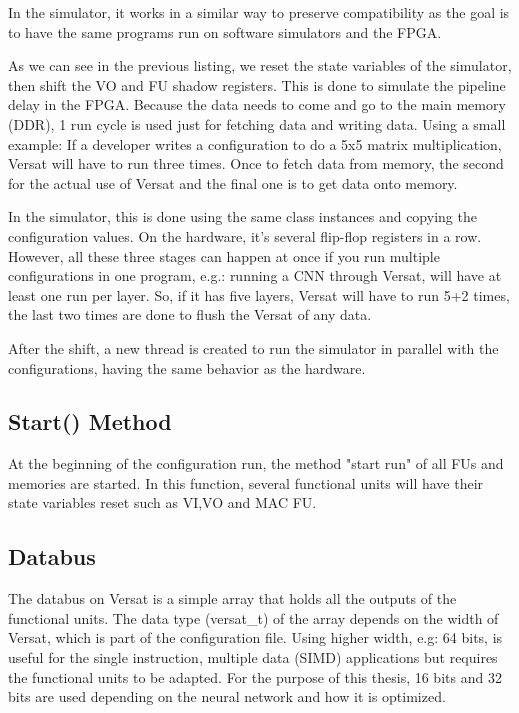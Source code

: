 In the simulator, it works in a similar way to preserve compatibility 
as the goal is to have the same
programs run on software simulators and the FPGA.



As we can see in the previous listing, we reset the state variables of the simulator, then shift the 
VO and FU shadow registers.
This is done to simulate the pipeline delay in the FPGA. 
Because the data needs to come and go to the main memory (DDR),
1 run cycle is used just for fetching data and writing data. 
Using a small example:
If a developer writes a configuration to do a 5x5 matrix multiplication, 
Versat will have to run three  times.
Once to fetch data from memory, the second for the actual use of Versat 
and the final one is to get data onto memory.

In the simulator, this is done using the same class instances and 
copying the configuration values. On the hardware, it's several flip-flop registers in a row.
However, all these three  stages can happen at once if you run multiple configurations in one program, 
e.g.: running a CNN
through Versat, will have at least one run per layer. 
So, if it has five layers, Versat will have to run 5+2 times, the last two times are done to
flush the Versat of any data.

After the shift, a new thread is created to run the simulator in parallel 
with the configurations,
having the same behavior as the hardware.

\subsection{Start() Method}

At the beginning of the configuration run, the method "start run" of 
all FUs and memories are started.
In this function, several functional units will have their state variables 
reset such as VI,VO and MAC FU.

\subsection{Databus}

The databus on Versat is a simple array that holds all the outputs of the functional units.
The data type (versat\_t) of the array depends on the width of Versat, which is part of the configuration file.
Using higher width, e.g: 64 bits, is useful for the single instruction, multiple data (SIMD) 
applications but requires the functional units to be adapted.
For the purpose of this thesis, 16 bits and 32 bits are used depending 
on the neural network and how it is optimized.

